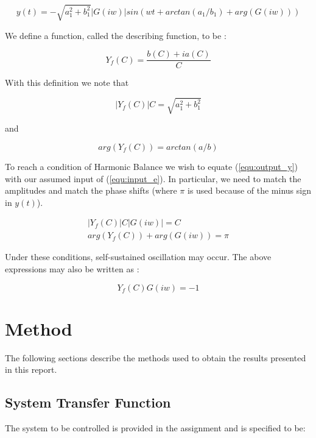 \documentclass[a4paper, titlepage]{article}
\begin{document}
\begin{equation}
	y(t) = -\sqrt{a_{1}^2+b_{1}^2}|G(iw)|sin(wt+arctan(a_{1}/b_{1})+arg(G(iw)))
	\label{equ:output_y}
\end{equation}
 

We define a function, called the describing function, to be \citep[p. 358]{glad00}:

\begin{equation}
	Y_{f}(C) = \frac{b(C)+ia(C)}{C}
	\label{equ:descrbingFunction}
\end{equation}

With this definition we note that

\begin{equation}
	|Y_{f}(C)|C = \sqrt{a_{1}^2+b_{1}^2}
\end{equation}

and

\begin{equation}
	arg(Y_{f}(C)) = arctan(a/b)
\end{equation}

To reach a condition of Harmonic Balance we wish to equate (\ref{equ:output_y}) with our assumed input of (\ref{equ:input_e}).   
In particular, we need to match the amplitudes and match the phase shifts (where $\pi$ is used because of the minus sign in $y(t)$). 

\begin{equation}
\begin{split}
	|Y_{f}(C)|C|G(iw)| = C \\
	arg(Y_{f}(C))+arg(G(iw)) = \pi
\end{split}
\end{equation}

Under these conditions, self-sustained oscillation may occur.  The above expressions may also be written as \citep[p. 359]{glad00}:

\begin{equation}
	Y_{f}(C)G(iw) = -1
\label{equ:selfOsc}
\end{equation}
 
\section{Method}
The following sections describe the methods used to obtain the results presented in this report.

\subsection{System Transfer Function}
The system to be controlled is provided in the assignment and is specified to be:
\end{document}
